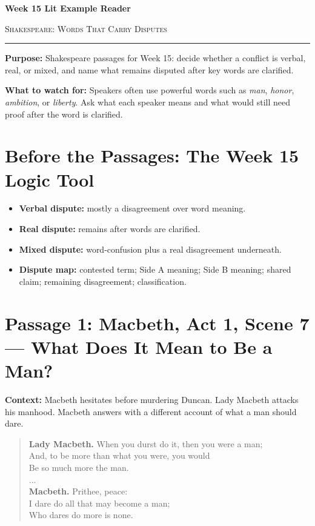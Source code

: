 \documentclass[12pt]{article}
\newenvironment{playpassage}{\begin{quote}\footnotesize\setlength{\parskip}{0.08em}\setlength{\parindent}{0pt}}{\end{quote}}
\newcommand{\speaker}[1]{\textbf{#1.}}
\begin{document}
\begin{center}
{\LARGE\bfseries Week 15 Lit Example Reader}\par\vspace{0.02em}
{\large\scshape Shakespeare: Words That Carry Disputes}\par\vspace{0.06em}
\rule{0.78\textwidth}{0.5pt}
\end{center}

\textbf{Purpose:} Shakespeare passages for Week 15: decide whether a conflict is verbal, real, or mixed, and name what remains disputed after key words are clarified.

\textbf{What to watch for:} Speakers often use powerful words such as \textit{man}, \textit{honor}, \textit{ambition}, or \textit{liberty}. Ask what each speaker means and what would still need proof after the word is clarified.

\section*{Before the Passages: The Week 15 Logic Tool}

\begin{itemize}[leftmargin=1.3em,itemsep=0.05em,topsep=0.08em,parsep=0.03em]
\item \textbf{Verbal dispute:} mostly a disagreement over word meaning.
\item \textbf{Real dispute:} remains after words are clarified.
\item \textbf{Mixed dispute:} word-confusion plus a real disagreement underneath.
\item \textbf{Dispute map:} contested term; Side A meaning; Side B meaning; shared claim; remaining disagreement; classification.
\end{itemize}

\section*{Passage 1: Macbeth, Act 1, Scene 7 --- What Does It Mean to Be a Man?}

\textbf{Context:} Macbeth hesitates before murdering Duncan. Lady Macbeth attacks his manhood. Macbeth answers with a different account of what a man should dare.

\begin{playpassage}
\speaker{Lady Macbeth} When you durst do it, then you were a man;\\
And, to be more than what you were, you would\\
Be so much more the man.\\
...\\
\speaker{Macbeth} Prithee, peace:\\
I dare do all that may become a man;\\
Who dares do more is none.
\end{playpassage}
\end{document}
